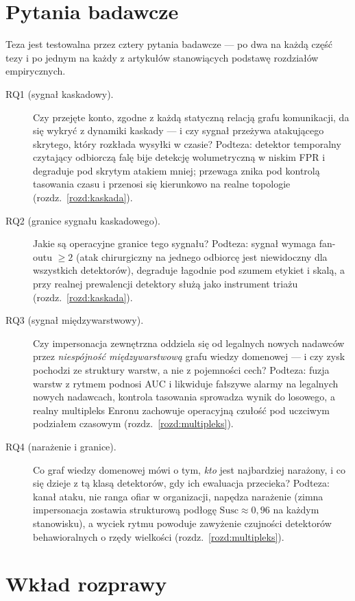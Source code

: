 \section{Pytania badawcze}
\label{sec:w-rq}

Teza jest testowalna przez cztery pytania badawcze --- po dwa na każdą
część tezy i po jednym na każdy z artykułów stanowiących podstawę
rozdziałów empirycznych.

\begin{description}
\item[RQ1 (sygnał kaskadowy).] Czy przejęte konto, zgodne z każdą
statyczną relacją grafu komunikacji, da się wykryć z dynamiki kaskady ---
i czy sygnał przeżywa atakującego skrytego, który rozkłada wysyłki
w czasie? Podteza: detektor temporalny czytający odbiorczą falę bije
detekcję wolumetryczną w niskim FPR i degraduje pod skrytym atakiem
mniej; przewaga znika pod kontrolą tasowania czasu i przenosi się
kierunkowo na realne topologie (rozdz.~\ref{rozd:kaskada}).
\item[RQ2 (granice sygnału kaskadowego).] Jakie są operacyjne granice
tego sygnału? Podteza: sygnał wymaga fan-outu $\ge2$ (atak chirurgiczny
na jednego odbiorcę jest niewidoczny dla wszystkich detektorów),
degraduje łagodnie pod szumem etykiet i skalą, a przy realnej
prewalencji detektory służą jako instrument triażu (rozdz.~\ref{rozd:kaskada}).
\item[RQ3 (sygnał międzywarstwowy).] Czy impersonacja zewnętrzna
oddziela się od legalnych nowych nadawców przez \emph{niespójność
międzywarstwową} grafu wiedzy domenowej --- i czy zysk pochodzi ze
struktury warstw, a nie z pojemności cech? Podteza: fuzja warstw z rytmem
podnosi AUC i likwiduje fałszywe alarmy na legalnych nowych nadawcach,
kontrola tasowania sprowadza wynik do losowego, a realny multipleks
Enronu zachowuje operacyjną czułość pod uczciwym podziałem czasowym
(rozdz.~\ref{rozd:multipleks}).
\item[RQ4 (narażenie i granice).] Co graf wiedzy domenowej mówi o tym,
\emph{kto} jest najbardziej narażony, i co się dzieje z tą klasą
detektorów, gdy ich ewaluacja przecieka? Podteza: kanał ataku, nie ranga
ofiar w organizacji, napędza narażenie (zimna impersonacja zostawia
strukturową podłogę $\mathrm{Susc}\approx0{,}96$ na każdym stanowisku),
a wyciek rytmu powoduje zawyżenie czujności detektorów behawioralnych o rzędy
wielkości (rozdz.~\ref{rozd:multipleks}).
\end{description}

\section{Wkład rozprawy}
\label{sec:w-wklad}

